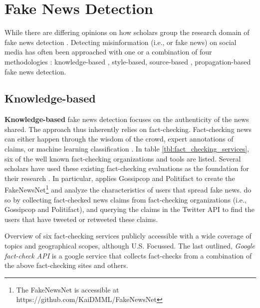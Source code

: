 \documentclass[
10pt, %
a4paper, %
oneside, %
headinclude,footinclude, %
] {book}%
\begin{document}
\section{Fake News Detection}
\label{sec:fake_news_detection}

While there are differing opinions on how scholars group the research domain of fake news detection \citep{shu2017datamining, zhou2020survey}. Detecting misinformation (i.e., or fake news) on social media has often been approached with one or a combination of four methodologies \citep{zhou2020survey}: knowledge-based \citep{shu2018userprofiles, shu2020fakenewsnet, mosleh2021elites}, style-based, source-based \citep{grinberg2019partisanship, halberstam2016homophily, lazer2018science, guess2020exposure, osmundsen2021partisan, mosleh2021elites}, propagation-based fake news detection. 

\subsection{Knowledge-based}
\label{subsec:knowledge_based}

\textbf{Knowledge-based} fake news detection focuses on the authenticity of the news shared. The approach thus inherently relies on fact-checking. Fact-checking news can either happen through the wisdom of the crowd, expert annotations of claims, or machine learning classification \citep{zhou2020survey, shu2017datamining}. In table \ref{tbl:fact_checking_services}, six of the well known fact-checking organizations and tools are listed. Several scholars have used these existing fact-checking evaluations as the foundation for their research \citep{shu2018userprofiles, shu2020fakenewsnet, mosleh2021elites}. In particular, \cite{shu2020fakenewsnet} applies Gossipcop and Politifact to create the FakeNewsNet\footnote{The FakeNewsNet is accessible at https://github.com/KaiDMML/FakeNewsNet} and analyze the characteristics of users that spread fake news. \cite{shu2020fakenewsnet} do so by collecting fact-checked news claims from fact-checking organizations (i.e., Gossipcop and Politifact), and querying the claims in the Twitter API to find the users that have tweeted or retweeted these claims. 


\label{app_linear_data_upsample}
\begin{table}[H]
  \tiny %
  \begin{center}
  
  \caption{Overview of six fact-checking services publicly accessible with a wide coverage of topics and geographical scopes, although U.S. Focussed. The last outlined, \emph{Google fact-check API} is a google service that collects fact-checks from a combination of the above fact-checking sites and others.}
  \label{tbl:fact_checking_services}
  \end{center}
\end{table}
\end{document}
